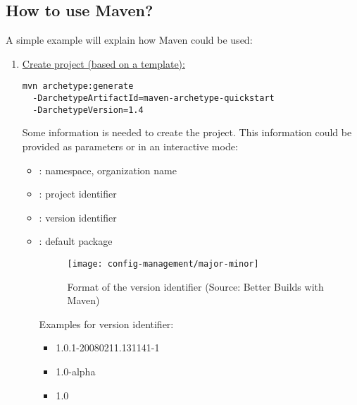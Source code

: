 \subsection{How to use Maven?}
A simple example will explain how Maven could be used:
\begin{enumerate}
\item \underline{Create project (based on a template):}
\begin{lstlisting}
mvn archetype:generate
  -DarchetypeArtifactId=maven-archetype-quickstart
  -DarchetypeVersion=1.4
\end{lstlisting}
Some information is needed to create the project. This information
could be provided as parameters or in an interactive mode:

  \begin{itemize}
  \item {}: namespace, organization name
  \item {}: project identifier
  \item {}: version identifier
  \item {}: default package
  \begin{figure}[H]
  \begin{center}
  \texttt{[image: config-management/major-minor]}
  \end{center}
  \caption{Format of the version identifier (Source: Better Builds with Maven)}
  \end{figure}
\newslide
Examples for version identifier:
  \begin{itemize}
  \item 1.0.1-20080211.131141-1
  \item 1.0-alpha
  \item 1.0
  \end{itemize}
  \end{itemize}


\end{enumerate}
